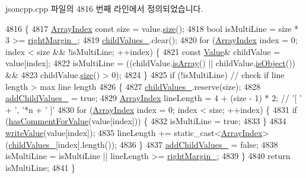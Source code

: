 jsoncpp.\+cpp 파일의 4816 번째 라인에서 정의되었습니다.


\begin{DoxyCode}
4816                                                           \{
4817   \hyperlink{namespace_json_a8048e741f2177c3b5d9ede4a5b8c53c2}{ArrayIndex} \textcolor{keyword}{const} size = value.\hyperlink{class_json_1_1_value_a0ec2808e1d7efa4e9fad938d6667be44}{size}();
4818   \textcolor{keywordtype}{bool} isMultiLine = size * 3 >= \hyperlink{class_json_1_1_styled_stream_writer_a94299ec0a9bb925b2dbbab7c1f2b390a}{rightMargin\_};
4819   \hyperlink{class_json_1_1_styled_stream_writer_aafd62e00a401df73fcacb2e410114b3d}{childValues\_}.clear();
4820   \textcolor{keywordflow}{for} (\hyperlink{namespace_json_a8048e741f2177c3b5d9ede4a5b8c53c2}{ArrayIndex} index = 0; index < size && !isMultiLine; ++index) \{
4821     \textcolor{keyword}{const} \hyperlink{class_json_1_1_value}{Value}& childValue = value[index];
4822     isMultiLine = ((childValue.\hyperlink{class_json_1_1_value_a1627eb9d6568d6d0252fa8bb711c0a59}{isArray}() || childValue.\hyperlink{class_json_1_1_value_a8cf96c0f2a552051fcfc78ffee60e037}{isObject}()) &&
4823                         childValue.\hyperlink{class_json_1_1_value_a0ec2808e1d7efa4e9fad938d6667be44}{size}() > 0);
4824   \}
4825   \textcolor{keywordflow}{if} (!isMultiLine) \textcolor{comment}{// check if line length > max line length}
4826   \{
4827     \hyperlink{class_json_1_1_styled_stream_writer_aafd62e00a401df73fcacb2e410114b3d}{childValues\_}.reserve(size);
4828     \hyperlink{class_json_1_1_styled_stream_writer_a4e4bb7fc223b2652b72b523b1ce414fa}{addChildValues\_} = \textcolor{keyword}{true};
4829     \hyperlink{namespace_json_a8048e741f2177c3b5d9ede4a5b8c53c2}{ArrayIndex} lineLength = 4 + (size - 1) * 2; \textcolor{comment}{// '[ ' + ', '*n + ' ]'}
4830     \textcolor{keywordflow}{for} (\hyperlink{namespace_json_a8048e741f2177c3b5d9ede4a5b8c53c2}{ArrayIndex} index = 0; index < size; ++index) \{
4831       \textcolor{keywordflow}{if} (\hyperlink{class_json_1_1_styled_stream_writer_ad2892f57171919fa4f8a5ae5574755cf}{hasCommentForValue}(value[index])) \{
4832         isMultiLine = \textcolor{keyword}{true};
4833       \}
4834       \hyperlink{class_json_1_1_styled_stream_writer_a4359250e09273fa0144021684be001ae}{writeValue}(value[index]);
4835       lineLength += \textcolor{keyword}{static\_cast<}\hyperlink{namespace_json_a8048e741f2177c3b5d9ede4a5b8c53c2}{ArrayIndex}\textcolor{keyword}{>}(\hyperlink{class_json_1_1_styled_stream_writer_aafd62e00a401df73fcacb2e410114b3d}{childValues\_}[index].length());
4836     \}
4837     \hyperlink{class_json_1_1_styled_stream_writer_a4e4bb7fc223b2652b72b523b1ce414fa}{addChildValues\_} = \textcolor{keyword}{false};
4838     isMultiLine = isMultiLine || lineLength >= \hyperlink{class_json_1_1_styled_stream_writer_a94299ec0a9bb925b2dbbab7c1f2b390a}{rightMargin\_};
4839   \}
4840   \textcolor{keywordflow}{return} isMultiLine;
4841 \}
\end{DoxyCode}
